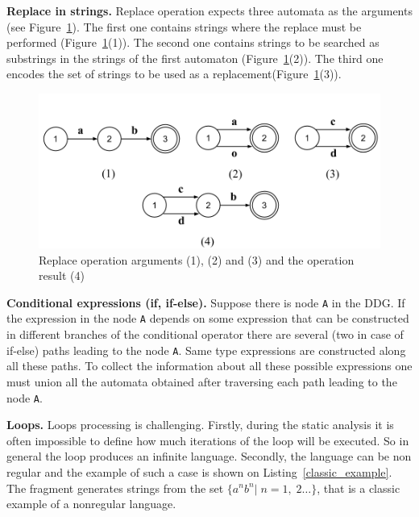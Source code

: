 \textbf{Replace in strings.} Replace operation expects three automata as the arguments (see Figure~\ref{replace_pic}). The first one contains strings where the replace must be performed (Figure~\ref{replace_pic}(1)). The second one contains strings to be searched as substrings in the strings of the first automaton (Figure~\ref{replace_pic}(2)). The third one encodes the set of strings to be used as a replacement(Figure~\ref{replace_pic}(3)).

\begin{figure}[h!]
    \begin{center}
        \includegraphics[scale=0.3]{Figures/automata_replace.png}
    \end{center}
    \caption{Replace operation arguments (1), (2) and (3) and the operation result (4)}
    \label{replace_pic}
\end{figure} 

\textbf{Conditional expressions (if, if-else).} Suppose there is node \verb|A| in the DDG. If the expression in the node \verb|A| depends on some expression that can be constructed in different branches of the conditional operator there are several (two in case of if-else) paths leading to the node \verb|A|. Same type expressions are constructed along all these paths. To collect the information about all these possible expressions one must union all the automata obtained after traversing each path leading to the node \verb|A|.

\textbf{Loops.} Loops processing is challenging. Firstly, during the static analysis it is often impossible to define how much iterations of the loop will be executed. So in general the loop produces an infinite language. Secondly, the language can be non regular and the example of such a case is shown on Listing~\ref{classic_example}. The fragment generates strings from the set $\{ a^nb^n |\; n = 1,\; 2 \ldots \}$, that is a classic example of a nonregular language.

